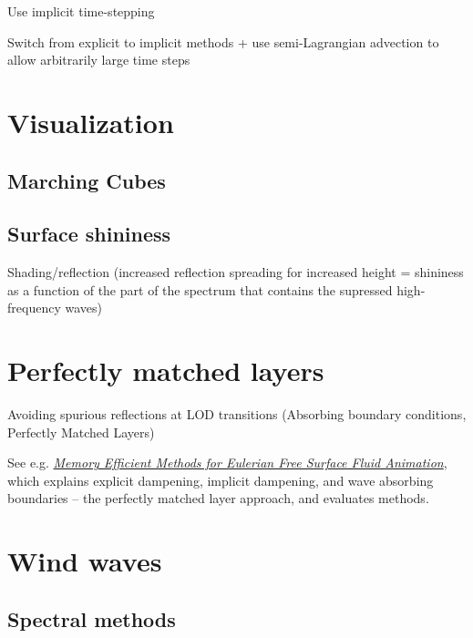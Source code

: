 Use implicit time-stepping

Switch from explicit to implicit methods + use semi-Lagrangian advection to allow arbitrarily large time steps

\section{Visualization}

\subsection{Marching Cubes}

\subsection{Surface shininess}

Shading/reflection (increased reflection spreading for increased height = shininess as a function of the part of the spectrum that contains the supressed high-frequency waves)



\section{Perfectly matched layers}

Avoiding spurious reflections at LOD transitions (Absorbing boundary conditions, Perfectly Matched Layers)

See e.g. \textit{\href{http://liu.diva-portal.org/smash/get/diva2:359805/FULLTEXT01}{Memory Efficient Methods for Eulerian Free Surface Fluid Animation}}, which explains explicit dampening, implicit dampening, and wave absorbing boundaries -- the perfectly matched layer approach, and evaluates methods.

\section{Wind waves}

\subsection{Spectral methods}


